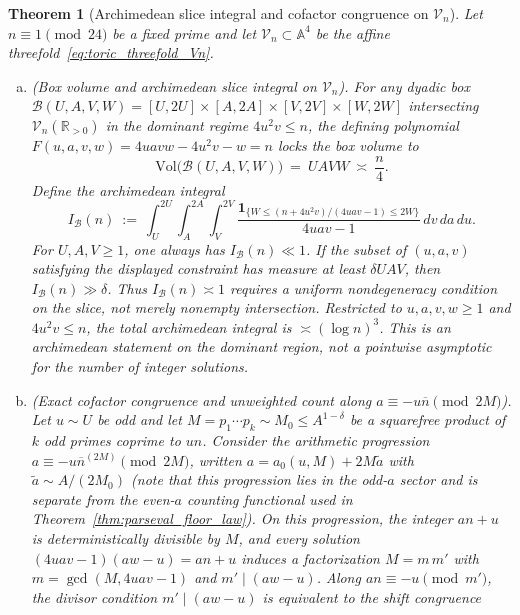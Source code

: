 \documentclass[11pt, a4paper]{article}
\theoremstyle{plain}
\newtheorem{theorem}{Theorem}[section]
\theoremstyle{definition}
\newcommand{\R}{\mathbb{R}}
\begin{document}
\begin{theorem}[Archimedean slice integral and cofactor congruence on $\mathcal{V}_n$]\label{thm:toric_volume_conservation}
Let $n\equiv1\pmod{24}$ be a fixed prime and let $\mathcal{V}_n\subset\mathbb{A}^{4}$ be the affine threefold~\eqref{eq:toric_threefold_Vn}.
\begin{enumerate}[(a)]
    \item \emph{(Box volume and archimedean slice integral on $\mathcal{V}_n$).} For any dyadic box $\mathcal{B}(U,A,V,W)=[U,2U]\times[A,2A]\times[V,2V]\times[W,2W]$ intersecting $\mathcal{V}_n(\R_{>0})$ in the dominant regime $4u^{2}v\le n$, the defining polynomial $F(u,a,v,w)=4uavw-4u^{2}v-w=n$ locks the box volume to
    \begin{equation}\label{eq:toric_volume_lock}
    \mathrm{Vol}\big(\mathcal{B}(U,A,V,W)\big)\ =\ UAVW\ \asymp\ \frac{n}{4}.
    \end{equation}
    Define the archimedean integral
    \begin{equation}\label{eq:archimedean_surface_constant}
    I_{\mathcal{B}}(n)\ :=\ \int_{U}^{2U}\int_{A}^{2A}\int_{V}^{2V}\frac{\mathbf{1}_{\{W\le(n+4u^{2}v)/(4uav-1)\le 2W\}}}{4uav-1}\,dv\,da\,du.
    \end{equation}
    For $U,A,V\ge1$, one always has $I_{\mathcal{B}}(n)\ll 1$. If the subset of $(u,a,v)$ satisfying the displayed constraint has measure at least $\delta UAV$, then $I_{\mathcal{B}}(n)\gg\delta$. Thus $I_{\mathcal{B}}(n)\asymp 1$ requires a uniform nondegeneracy condition on the slice, not merely nonempty intersection. Restricted to $u,a,v,w\ge1$ and $4u^{2}v\le n$, the total archimedean integral is $\asymp(\log n)^{3}$. This is an archimedean statement on the dominant region, not a pointwise asymptotic for the number of integer solutions.
    \item \emph{(Exact cofactor congruence and unweighted count along $a\equiv-u\overline{n}\pmod{2M}$).} Let $u\sim U$ be odd and let $M=p_1\cdots p_k\sim M_0\le A^{1-\delta}$ be a squarefree product of $k$ odd primes coprime to $un$. Consider the arithmetic progression $a\equiv-u\overline{n}^{(2M)}\pmod{2M}$, written $a=a_0(u,M)+2M\tilde{a}$ with $\tilde{a}\sim A/(2M_0)$ (note that this progression lies in the odd-$a$ sector and is separate from the even-$a$ counting functional used in Theorem~\ref{thm:parseval_floor_law}). On this progression, the integer $an+u$ is deterministically divisible by $M$, and every solution $(4uav-1)(aw-u)=an+u$ induces a factorization $M=m\,m'$ with $m=\gcd(M,4uav-1)$ and $m'\mid(aw-u)$. Along $an\equiv-u\pmod{m'}$, the divisor condition $m'\mid(aw-u)$ is equivalent to the shift congruence

\end{enumerate}
\end{theorem}
\end{document}
